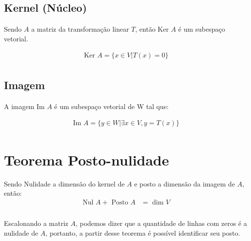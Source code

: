 \documentclass{article}
\begin{document}
        \subsection{Kernel (Núcleo)}
            \paragraph{}
            Sendo $A$ a matriz da transformação linear $T$, então $\text{Ker } A$ é um subespaço vetorial.

            \begin{align*}
                \text{Ker } A = \{x \in V | T(x) = 0\}\\
            \end{align*}

        \subsection{Imagem}
            \paragraph{}
            A  imagem Im $A$ é um subespaço vetorial de W tal que: 

            \begin{align*}
                \text{Im } A = \{ y \in W | \exists x \in V, y = T(x) \}\\
            \end{align*}

    \section{Teorema Posto-nulidade}
        \paragraph{}
        Sendo Nulidade a dimensão do kernel de $A$ e posto a dimensão da imagem de $A$, então:
        \begin{align*}
            \text{Nul } A + \text{ Posto } A &= \text{ dim } V\\
        \end{align*}

        \paragraph{}
        Escalonando a matriz $A$, podemos dizer que a quantidade de linhas com zeros é a nulidade de $A$, portanto, a partir desse
        teorema é possível identificar seu posto.
\end{document}
